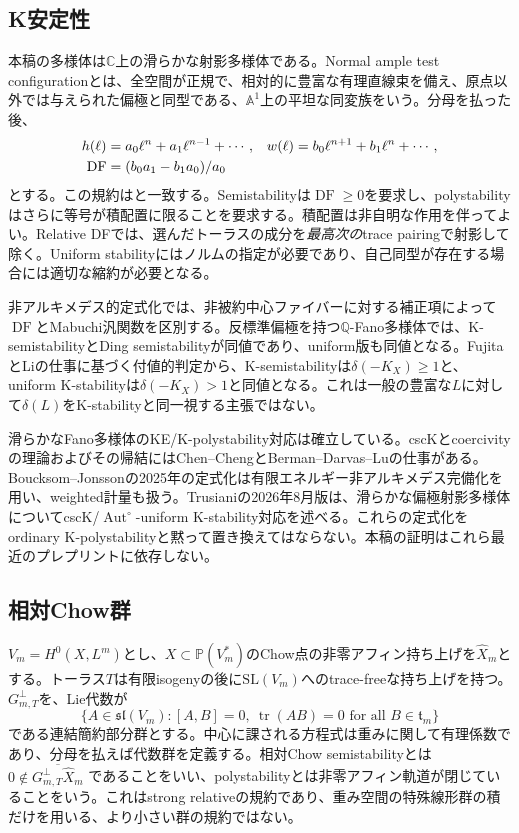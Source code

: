 \documentclass[12pt]{amsart}
\theoremstyle{definition}
\theoremstyle{remark}
\numberwithin{equation}{section}
\DeclareMathOperator{\tr}{tr}
\DeclareMathOperator{\Autop}{Aut}
\newcommand{\C}{\mathbb{C}}
\newcommand{\Q}{\mathbb{Q}}
\newcommand{\mP}{\mathbb{P}}
\DeclareMathOperator{\DF}{DF}
\begin{document}
\subsection{K安定性}
本稿の多様体は$\C$上の滑らかな射影多様体である。Normal ample test configurationとは、全空間が正規で、相対的に豊富な有理直線束を備え、原点以外では与えられた偏極と同型である、$\mathbb A^1$上の平坦な同変族をいう。分母を払った後、
\begin{align}\label{ja-DF}
h(\ell)&=a_0\ell^n+a_1\ell^{n-1}+\cdots,&
w(\ell)&=b_0\ell^{n+1}+b_1\ell^n+\cdots,\notag\\
\DF&=(b_0a_1-b_1a_0)/a_0
\end{align}
とする。この規約は\cite[\S2]{ja-SS}と一致する。Semistabilityは$\DF\geq0$を要求し、polystabilityはさらに等号が積配置に限ることを要求する。積配置は非自明な作用を伴ってよい。Relative DFでは、選んだトーラスの成分を\emph{最高次の}trace pairingで射影して除く。Uniform stabilityにはノルムの指定が必要であり、自己同型が存在する場合には適切な縮約が必要となる。

非アルキメデス的定式化では、非被約中心ファイバーに対する補正項によって$\DF$とMabuchi汎関数を区別する\cite{ja-BHJ}。反標準偏極を持つ$\Q$-Fano多様体では、K-semistabilityとDing semistabilityが同値であり、uniform版も同値となる\cite{ja-Fuj}。FujitaとLiの仕事に基づく付値的判定から、K-semistabilityは$\delta(-K_X)\geq1$と、uniform K-stabilityは$\delta(-K_X)>1$と同値となる\cite[Theorem B]{ja-BluJ}。これは一般の豊富な$L$に対して$\delta(L)$をK-stabilityと同一視する主張ではない。

滑らかなFano多様体のKE/K-polystability対応は確立している\cite{ja-CDS}。cscKとcoercivityの理論およびその帰結にはChen--ChengとBerman--Darvas--Luの仕事がある\cite{ja-CC,ja-BDL}。Boucksom--Jonssonの2025年の定式化は有限エネルギー非アルキメデス完備化を用い、weighted計量も扱う\cite{ja-BJ25}。Trusianiの2026年8月版は、滑らかな偏極射影多様体についてcscK/$\Autop^\circ$-uniform K-stability対応を述べる\cite{ja-Tru26}。これらの定式化をordinary K-polystabilityと黙って置き換えてはならない。本稿の証明はこれら最近のプレプリントに依存しない。

\subsection{相対Chow群}
$V_m=H^0(X,L^m)$とし、$X\subset\mP(V_m^*)$のChow点の非零アフィン持ち上げを$\widehat X_m$とする。トーラス$T$は有限isogenyの後に$\mathrm{SL}(V_m)$へのtrace-freeな持ち上げを持つ。$G_{m,T}^{\perp}$を、Lie代数が
\begin{equation}\label{ja-group}
\{A\in\mathfrak{sl}(V_m):[A,B]=0,\ \tr(AB)=0
\text{ for all }B\in\mathfrak t_m\}
\end{equation}
である連結簡約部分群とする。中心に課される方程式は重みに関して有理係数であり、分母を払えば代数群を定義する。相対Chow semistabilityとは
$0\notin\overline{G_{m,T}^{\perp}\widehat X_m}$
であることをいい、polystabilityとは非零アフィン軌道が閉じていることをいう。これはstrong relativeの規約であり、重み空間の特殊線形群の積だけを用いる、より小さい群の規約ではない\cite[Definitions 3.4--3.5]{ja-Has17}。
\end{document}
